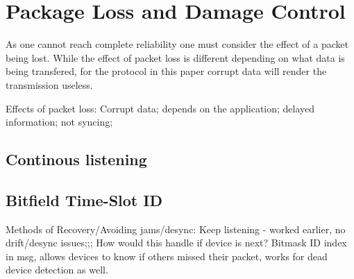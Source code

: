 \section{Package Loss and Damage Control}
As one cannot reach complete reliability one must consider the effect of a packet being lost.
While the effect of packet loss is different depending on what data is being transfered, for the protocol in this paper corrupt data will render the transmission useless.


Effects of packet loss:
Corrupt data; depends on the application; delayed information; not syncing;
\subsection{Continous listening}
\subsection{Bitfield Time-Slot ID}

Methods of Recovery/Avoiding jams/desync:
Keep listening - worked earlier, no drift/desync issues;;; How would this handle if device is next?
Bitmask ID index in msg, allows devices to know if others missed their packet, works for dead device detection as well.
